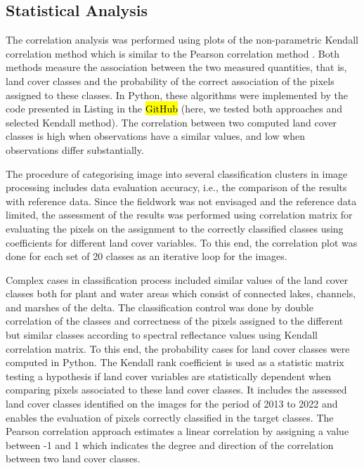 \documentclass[12pt,a4paper,oneside]{article}
\def \newpar{\vspace{6pt}}
\begin{document}
\subsection*{Statistical Analysis}

\newpar The correlation analysis was performed using plots of the non-parametric Kendall correlation method \citep{Kendall1938} which is similar to the Pearson correlation method \citep{Pearson1895}. Both methods measure the association between the two measured quantities, that is, land cover classes and the probability of the correct association of the pixels assigned to these classes. In Python, these algorithms were implemented by the code presented in Listing\hl{ }in the \hl{GitHub} (here, we tested both approaches and selected Kendall method). The correlation between two computed land cover classes is high when observations have a similar values, and low when observations differ substantially.

\newpar The procedure of categorising image into several classification clusters in image processing includes data evaluation accuracy, i.e., the comparison of the results with reference data. Since the fieldwork was not envisaged and the reference data limited, the assessment of the results was performed using correlation matrix for evaluating the pixels on the assignment to the correctly classified classes using coefficients for different land cover variables. To this end, the correlation plot was done for each set of 20 classes as an iterative loop for the images.

\newpar Complex cases in classification process included similar values of the land cover classes both for plant and water areas which consist of connected lakes, channels, and marshes of the delta. The classification control was done by double correlation of the classes and correctness of the pixels assigned to the different but similar classes according to spectral reflectance values using Kendall correlation matrix. To this end, the probability cases for land cover classes were computed in Python. The Kendall rank coefficient is used as a statistic matrix testing a hypothesis if land cover variables are statistically dependent when comparing pixels associated to these land cover classes. It includes the assessed land cover classes identified on the images for the period of 2013 to 2022 and enables the evaluation of pixels correctly classified in the target classes. The Pearson correlation approach estimates a linear correlation by assigning a value between -1 and 1 which indicates the degree and direction of the correlation between two land cover classes.
\end{document}
